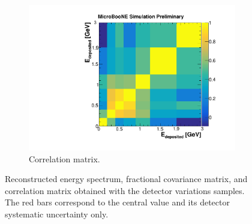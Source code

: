 \begin{figure}[htbp]
\begin{center}
\begin{subfigure}{0.48\textwidth}
      \includegraphics[width=\linewidth]{figures/corr_det.pdf}
      \caption{Correlation matrix.}  \label{fig:corr_det}
    \end{subfigure}
    \caption{Reconstructed energy spectrum, fractional covariance matrix, and correlation matrix obtained with the detector variations samples. The red bars correspond to the central value and its detector systematic uncertainty only.} \label{fig:det_sys}
	\end{center}
\end{figure}


